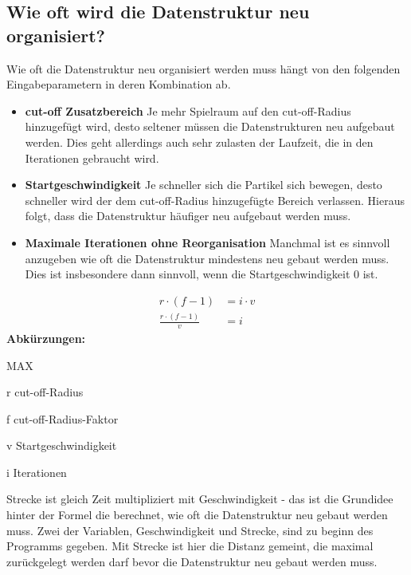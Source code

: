 \documentclass[
12pt,
a4paper,
BCOR10mm,
DIV14,
headsepline,
]{scrreprt}
\begin{document}
	\subsection{Wie oft wird die Datenstruktur neu organisiert?}%
	Wie oft die Datenstruktur neu organisiert werden muss hängt von den folgenden Eingabeparametern in deren Kombination ab.
	\begin{itemize}
		\item \textbf{cut-off Zusatzbereich} Je mehr Spielraum auf den cut-off-Radius hinzugefügt wird, desto seltener müssen die Datenstrukturen neu aufgebaut werden. Dies geht allerdings auch sehr zulasten der Laufzeit, die in den Iterationen gebraucht wird.
		\item \textbf{Startgeschwindigkeit} Je schneller sich die Partikel sich bewegen, desto schneller wird der dem cut-off-Radius hinzugefügte Bereich verlassen. Hieraus folgt, dass die Datenstruktur häufiger neu aufgebaut werden muss.
		\item \textbf{Maximale Iterationen ohne Reorganisation} Manchmal ist es sinnvoll anzugeben wie oft die Datenstruktur mindestens neu gebaut werden muss. Dies ist insbesondere dann sinnvoll, wenn die Startgeschwindigkeit 0 ist.
	\end{itemize}
	\begin{align*}
	r \cdot (f - 1)&=i\cdot v\\
	\frac{r \cdot (f - 1)}{v}&=i
	\end{align*}
	\footnotesize\textbf{Abkürzungen:}\begin{labeling}[~--]{MAX}
		\item[r] cut-off-Radius
		\item[f] cut-off-Radius-Faktor
		\item[v] Startgeschwindigkeit
		\item[i] Iterationen
	\end{labeling}
	Strecke ist gleich Zeit multipliziert mit Geschwindigkeit - das ist die Grundidee hinter der Formel die berechnet, wie oft die Datenstruktur neu gebaut werden muss. Zwei der Variablen, Geschwindigkeit und Strecke, sind zu beginn des Programms gegeben. Mit Strecke ist hier die Distanz gemeint, die maximal zurückgelegt werden darf bevor die Datenstruktur neu gebaut werden muss.
\end{document}
